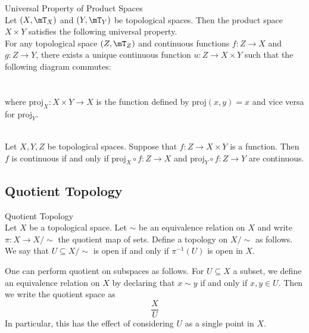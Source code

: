 \documentclass[a4paper]{article}
\begin{document}
\begin{prp}{Universal Property of Product Spaces}{}\\
Let $(X,\mT_X)$ and $(Y,\mT_Y)$ be topological spaces. Then the product space $X\times Y$ satisfies the following universal property. \\

For any topological space $(Z,\mT_Z)$ and continuous functions $f:Z\to X$ and $g:Z\to Y$, there exists a unique continuous function $u:Z\to X\times Y$ such that the following diagram commutes: \\
 \\~\\
where $\text{proj}_X:X\times Y\to X$ is the function defined by $\text{proj}(x,y)=x$ and vice versa for $\text{proj}_Y$. 
\end{prp}

\begin{crl}{}{}\\
Let $X,Y,Z$ be topological spaces. Suppose that $f:Z\to X\times Y$ is a function. Then $f$ is continuous if and only if $\text{proj}_X\circ f:Z\to X$ and $\text{proj}_Y\circ f:Z\to Y$ are continuous. 
\end{crl}

\subsection{Quotient Topology}
\begin{defn}{Quotient Topology}{}\\
Let $X$ be a topological space. Let $\sim$ be an equivalence relation on $X$ and write $\pi:X\to X/\sim$ the quotient map of sets. Define a topology on $X/\sim$ as follows. We say that $U\subseteq X/\sim$ is open if and only if $\pi^{-1}(U)$ is open in $X$. 
\end{defn}

One can perform quotient on subspaces as follows. For $U\subseteq X$ a subset, we define an equivalence relation on $X$ by declaring that $x\sim y$ if and only if $x,y\in U$. Then we write the quotient space as $$\frac{X}{U}$$ In particular, this has the effect of considering $U$ as a single point in $X$. \\
\end{document}
